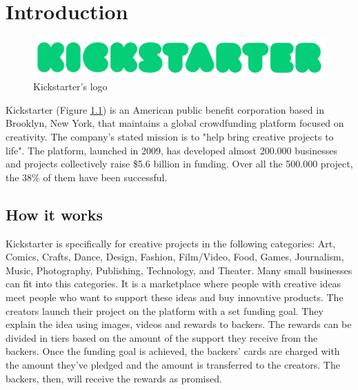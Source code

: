 \documentclass{report}
\begin{document}


\tableofcontents

\chapter{Introduction}\label{intro}
\begin{figure}
    \centering
    \includegraphics[width=0.6\linewidth]{figuras/kickstarter_logo.png}
    \caption{Kickstarter's logo}
    \label{fig:ksl}
\end{figure}
Kickstarter (Figure \ref{fig:ksl}) is an American public benefit corporation based in Brooklyn, New York, that maintains a global crowdfunding platform focused on creativity. The company's stated mission is to "help bring creative projects to life". The platform, launched in 2009, has developed almost 200.000 businesses and projects collectively raise \$5.6 billion in funding. Over all the 500.000 project, the 38\% of them have been successful.  


\section{How it works}\label{antecedentes}
Kickstarter is specifically for creative projects in the following categories: Art, Comics, Crafts, Dance, Design, Fashion, Film/Video, Food, Games, Journalism, Music, Photography, Publishing, Technology, and Theater. Many small businesses can fit into this categories. It is a marketplace where people with creative ideas meet people who want to support these ideas and buy innovative products. The creators launch their project on the platform with a set funding goal. They explain the idea using images, videos and rewards to backers. The rewards can be divided in tiers based on the amount of the support they receive from the backers. Once the funding goal is achieved, the backers' cards are charged with the amount they've pledged and the amount is transferred to the creators. The backers, then, will receive the rewards as promised.  

\newpage
\end{document}
